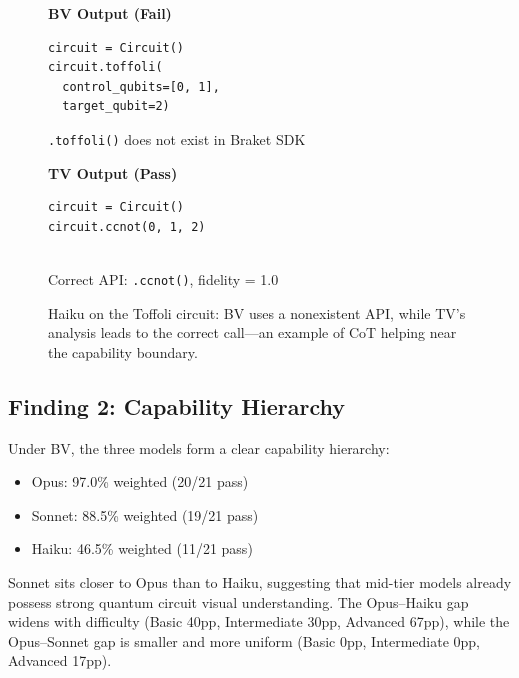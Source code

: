 \documentclass[conference]{IEEEtran}
\begin{document}
\begin{figure}[t]
\centering
\begin{minipage}[t]{0.48\columnwidth}
\centering\small\textbf{BV Output (Fail)}
\begin{lstlisting}[basicstyle=\ttfamily\scriptsize,frame=single,backgroundcolor=\color{red!8},xleftmargin=0pt,xrightmargin=0pt]
circuit = Circuit()
circuit.toffoli(
  control_qubits=[0, 1],
  target_qubit=2)
\end{lstlisting}
\vspace{-0.5em}
{\scriptsize\color{red} \texttt{.toffoli()} does not exist in Braket SDK}
\end{minipage}
\hfill
\begin{minipage}[t]{0.48\columnwidth}
\centering\small\textbf{TV Output (Pass)}
\begin{lstlisting}[basicstyle=\ttfamily\scriptsize,frame=single,backgroundcolor=\color{green!8},xleftmargin=0pt,xrightmargin=0pt]
circuit = Circuit()
circuit.ccnot(0, 1, 2)


\end{lstlisting}
\vspace{-0.5em}
{\scriptsize\color{green!50!black} Correct API: \texttt{.ccnot()}, fidelity = 1.0}
\end{minipage}
\caption{Haiku on the Toffoli circuit: BV uses a nonexistent API, while TV's analysis leads to the correct call---an example of CoT helping near the capability boundary.}
\label{fig:bv_tv_example}
\end{figure}

\subsection{Finding 2: Capability Hierarchy}

Under BV, the three models form a clear capability hierarchy:

\begin{itemize}
    \item Opus: 97.0\% weighted (20/21 pass)
    \item Sonnet: 88.5\% weighted (19/21 pass)
    \item Haiku: 46.5\% weighted (11/21 pass)
\end{itemize}

Sonnet sits closer to Opus than to Haiku, suggesting that mid-tier models already possess strong quantum circuit visual understanding. The Opus--Haiku gap widens with difficulty (Basic 40pp, Intermediate 30pp, Advanced 67pp), while the Opus--Sonnet gap is smaller and more uniform (Basic 0pp, Intermediate 0pp, Advanced 17pp).
\end{document}
